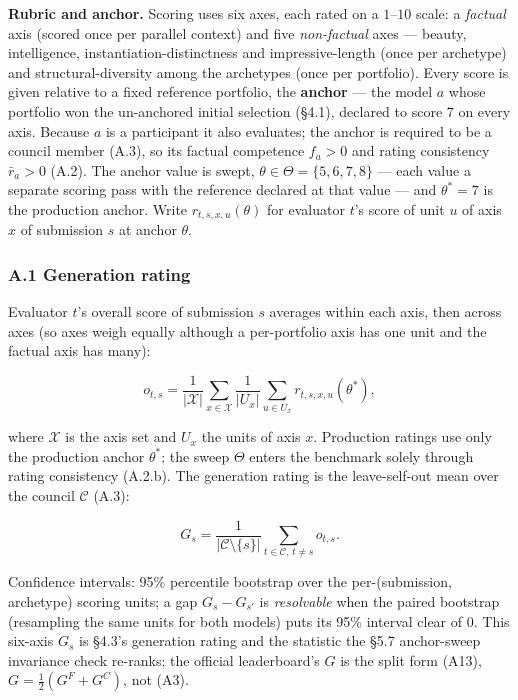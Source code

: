 \textbf{Rubric and anchor.} Scoring uses six axes, each rated on a \(1\)--\(10\) scale: a \emph{factual} axis (scored once per parallel context) and five \emph{non-factual} axes --- beauty, intelligence, instantiation-distinctness and impressive-length (once per archetype) and structural-diversity among the archetypes (once per portfolio). Every score is given relative to a fixed reference portfolio, the \textbf{anchor} --- the model \(a\) whose portfolio won the un-anchored initial selection (§4.1), declared to score \(7\) on every axis. Because \(a\) is a participant it also evaluates; the anchor is required to be a council member (A.3), so its factual competence \(f_a>0\) and rating consistency \(\bar r_a>0\) (A.2). The anchor value is swept, \(\theta\in\Theta=\{5,6,7,8\}\) --- each value a separate scoring pass with the reference declared at that value --- and \(\theta^{*}=7\) is the production anchor. Write \(r_{t,s,x,u}(\theta)\) for evaluator \(t\)'s score of unit \(u\) of axis \(x\) of submission \(s\) at anchor \(\theta\).

\subsubsection{A.1 Generation rating}\label{a.1-generation-rating}

Evaluator \(t\)'s overall score of submission \(s\) averages within each axis, then across axes (so axes weigh equally although a per-portfolio axis has one unit and the factual axis has many):

\[ o_{t,s}=\frac{1}{|\mathcal{X}|}\sum_{x\in\mathcal{X}}\frac{1}{|U_x|}\sum_{u\in U_x} r_{t,s,x,u}(\theta^{*}), \tag{A2}\]

where \(\mathcal{X}\) is the axis set and \(U_x\) the units of axis \(x\). Production ratings use only the production anchor \(\theta^{*}\); the sweep \(\Theta\) enters the benchmark solely through rating consistency (A.2.b). The generation rating is the leave-self-out mean over the council \(\mathcal{C}\) (A.3):

\[ G_s=\frac{1}{|\mathcal{C}\setminus\{s\}|}\sum_{t\in\mathcal{C},\,t\ne s} o_{t,s}. \tag{A3}\]

Confidence intervals: 95\% percentile bootstrap over the per-(submission, archetype) scoring units; a gap \(G_s-G_{s'}\) is \emph{resolvable} when the paired bootstrap (resampling the same units for both models) puts its 95\% interval clear of \(0\). This six-axis \(G_s\) is §4.3's generation rating and the statistic the §5.7 anchor-sweep invariance check re-ranks; the official leaderboard's \(G\) is the split form (A13), \(G=\tfrac12(G^{F}+G^{C})\), not (A3).

